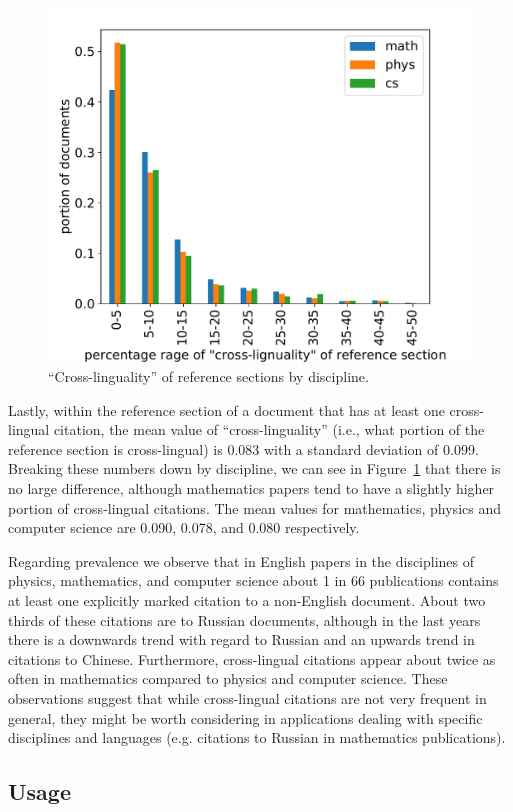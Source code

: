 \begin{figure}[tb]
\centering
\includegraphics[width=0.7\linewidth]{figures/ref_xling/cross_ling_ratio_distribution_lessthan64.pdf}
\caption{``Cross-linguality'' of reference sections by discipline.} \label{fig:xlinglyhistbydisc}
\end{figure}

Lastly, within the reference section of a document that has at least one cross-lingual citation, the mean value of ``cross-linguality'' (i.e., what portion of the reference section is cross-lingual) is 0.083 with a standard deviation of 0.099. Breaking these numbers down by discipline, we can see in Figure~\ref{fig:xlinglyhistbydisc} that there is no large difference, although mathematics papers tend to have a slightly higher portion of cross-lingual citations. The mean values for mathematics, physics and computer science are 0.090, 0.078, and 0.080 respectively.

Regarding prevalence we observe that in English papers in the disciplines of physics, mathematics, and computer science about 1 in 66 publications contains at least one explicitly marked citation to a non-English document. About two thirds of these citations are to Russian documents, although in the last years there is a downwards trend with regard to Russian and an upwards trend in citations to Chinese. Furthermore, cross-lingual citations appear about twice as often in mathematics compared to physics and computer science.
These observations suggest that while cross-lingual citations are not very frequent in general, they might be worth considering in applications dealing with specific disciplines and languages (e.g. citations to Russian in mathematics publications).

\subsection{Usage}

